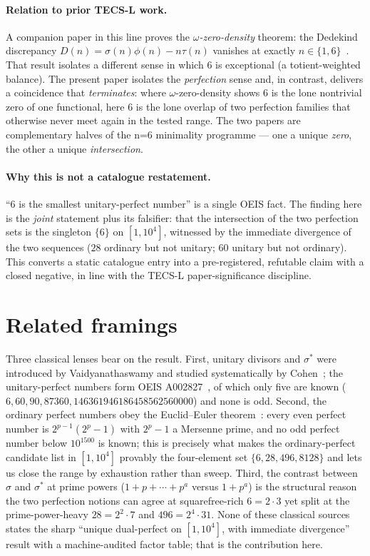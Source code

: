 \documentclass[11pt,a4paper]{article}
\newcommand{\sig}{\sigma}
\newcommand{\sigs}{\sigma^{*}}
\theoremstyle{plain}
\theoremstyle{definition}
\begin{document}
\paragraph{Relation to prior TECS-L work.}
A companion paper in this line proves the \emph{$\omega$-zero-density} theorem:
the Dedekind discrepancy $D(n)=\sig(n)\phi(n)-n\tau(n)$ vanishes at exactly
$n\in\{1,6\}$~\citep{tecsLozd}. That result isolates a different sense in which
$6$ is exceptional (a totient-weighted balance). The present paper isolates the
\emph{perfection} sense and, in contrast, delivers a coincidence that
\emph{terminates}: where $\omega$-zero-density shows $6$ is the lone nontrivial
zero of one functional, here $6$ is the lone overlap of two perfection families
that otherwise never meet again in the tested range. The two papers are
complementary halves of the n=6 minimality programme --- one a unique
\emph{zero}, the other a unique \emph{intersection}.

\paragraph{Why this is not a catalogue restatement.}
``$6$ is the smallest unitary-perfect number'' is a single OEIS fact. The
finding here is the \emph{joint} statement plus its falsifier: that the
intersection of the two perfection sets is the singleton $\{6\}$ on $[1,10^4]$,
witnessed by the immediate divergence of the two sequences ($28$ ordinary but
not unitary; $60$ unitary but not ordinary). This converts a static catalogue
entry into a pre-registered, refutable claim with a closed negative, in line
with the TECS-L paper-significance discipline.

\section{Related framings}
\label{sec:related}

Three classical lenses bear on the result. First, unitary divisors and $\sigs$
were introduced by Vaidyanathaswamy and studied systematically by
Cohen~\citep{cohen1960}; the unitary-perfect numbers form OEIS
A002827~\citep{oeisA002827}, of which only five are known
($6,60,90,87360,146361946186458562560000$) and none is odd. Second, the
ordinary perfect numbers obey the Euclid--Euler theorem~\citep{dickson}: every
even perfect number is $2^{p-1}(2^p-1)$ with $2^p-1$ a Mersenne prime, and no
odd perfect number below $10^{1500}$ is known; this is precisely what makes the
ordinary-perfect candidate list in $[1,10^4]$ provably the four-element set
$\{6,28,496,8128\}$ and lets us close the range by exhaustion rather than
sweep. Third, the contrast between $\sig$ and $\sigs$ at prime powers
($1+p+\cdots+p^a$ versus $1+p^a$) is the structural reason the two perfection
notions can agree at squarefree-rich $6=2\cdot3$ yet split at the
prime-power-heavy $28=2^2\cdot7$ and $496=2^4\cdot31$. None of these classical
sources states the sharp ``unique dual-perfect on $[1,10^4]$, with immediate
divergence'' result with a machine-audited factor table; that is the
contribution here.
\end{document}
